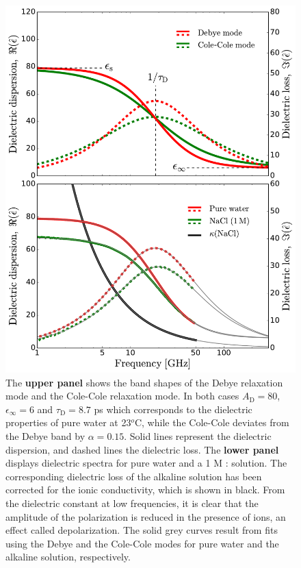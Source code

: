 \begin{figure}[h!]
	\centering
	\includegraphics[width=0.85\figwidth]{chapters/Chapter2_Methods/Graphics/DebyeCole_Modes.pdf}
	\caption{The \textbf{upper panel} shows the band shapes of the Debye relaxation mode and the Cole-Cole relaxation mode. In both cases $A_\text{D} = 80$, $\epsilon_\infty = 6$ and $\tau_\text{D} = 8.7$ ps which corresponds to the dielectric properties of pure water at 23$^o$C,\!\cite{Buchner1999b,Ellison1996} while the Cole-Cole deviates from the Debye band by $\alpha = 0.15$. Solid lines represent the dielectric dispersion, and dashed lines the dielectric loss. The \textbf{lower panel} displays dielectric spectra for pure water and a 1 M : solution. The corresponding dielectric loss of the alkaline solution has been corrected for the ionic conductivity, which is shown in black. From the dielectric constant at low frequencies, it is clear that the amplitude of the polarization is reduced in the presence of ions, an effect called depolarization. The solid grey curves result from fits using the Debye and the Cole-Cole modes for pure water and the alkaline solution, respectively.}
	\label{RelaxationModes}
\end{figure}


